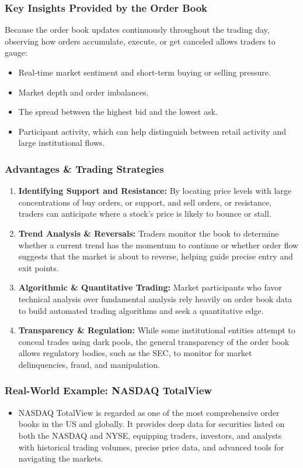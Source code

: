 \documentclass[12pt,openany]{book}
\begin{document}
\subsubsection{Key Insights Provided by the Order Book}
Because the order book updates continuously throughout the trading day, observing how orders accumulate, execute, or get canceled allows traders to gauge:

\begin{itemize}[leftmargin=*]
    \item Real-time market sentiment and short-term buying or selling pressure.
    \item Market depth and order imbalances.
    \item The spread between the highest bid and the lowest ask.
    \item Participant activity, which can help distinguish between retail activity and large institutional flows.
\end{itemize}

\subsubsection{Advantages \& Trading Strategies}
\begin{enumerate}[leftmargin=*]
    \item \textbf{Identifying Support and Resistance:} By locating price levels with large concentrations of buy orders, or support, and sell orders, or resistance, traders can anticipate where a stock's price is likely to bounce or stall.
    \item \textbf{Trend Analysis \& Reversals:} Traders monitor the book to determine whether a current trend has the momentum to continue or whether order flow suggests that the market is about to reverse, helping guide precise entry and exit points.
    \item \textbf{Algorithmic \& Quantitative Trading:} Market participants who favor technical analysis over fundamental analysis rely heavily on order book data to build automated trading algorithms and seek a quantitative edge.
    \item \textbf{Transparency \& Regulation:} While some institutional entities attempt to conceal trades using dark pools, the general transparency of the order book allows regulatory bodies, such as the SEC, to monitor for market delinquencies, fraud, and manipulation.
\end{enumerate}

\subsubsection{Real-World Example: NASDAQ TotalView}
\begin{itemize}[leftmargin=*]
    \item NASDAQ TotalView is regarded as one of the most comprehensive order books in the US and globally. It provides deep data for securities listed on both the NASDAQ and NYSE, equipping traders, investors, and analysts with historical trading volumes, precise price data, and advanced tools for navigating the markets.
\end{itemize}
\end{document}
